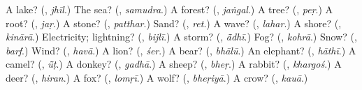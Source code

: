 \begin{tcolorbox}[breakable,colback=teal!4,colframe=teal!35!black,title={Before you move on}]
A lake? (\textbf{}, \emph{jhīl}.) The sea? (\textbf{}, \emph{samudra}.) A forest? (\textbf{}, \emph{jaṅgal}.) A tree? (\textbf{}, \emph{peṛ}.) A root? (\textbf{}, \emph{jaṛ}.) A stone? (\textbf{}, \emph{patthar}.) Sand? (\textbf{}, \emph{ret}.) A wave? (\textbf{}, \emph{lahar}.) A shore? (\textbf{}, \emph{kinārā}.) Electricity; lightning? (\textbf{}, \emph{bijlī}.) A storm? (\textbf{}, \emph{ā̃dhī}.) Fog? (\textbf{}, \emph{kohrā}.) Snow? (\textbf{}, \emph{barf}.) Wind? (\textbf{}, \emph{havā}.) A lion? (\textbf{}, \emph{śer}.) A bear? (\textbf{}, \emph{bhālū}.) An elephant? (\textbf{}, \emph{hāthī}.) A camel? (\textbf{}, \emph{ū̃ṭ}.) A donkey? (\textbf{}, \emph{gadhā}.) A sheep? (\textbf{}, \emph{bheṛ}.) A rabbit? (\textbf{}, \emph{khargoś}.) A deer? (\textbf{}, \emph{hiran}.) A fox? (\textbf{}, \emph{lomṛī}.) A wolf? (\textbf{}, \emph{bheṛiyā}.) A crow? (\textbf{}, \emph{kauā}.)
\end{tcolorbox}
